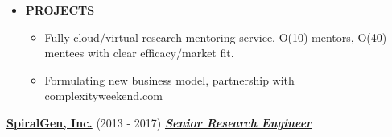 \documentclass{article}
\newcommand{\employer}[3]{{ \textbf{#1} (#2) \underline{\textbf{\emph{#3}}}\\  }}
\begin{document}
    \begin{itemize}

      \item \textbf{PROJECTS}
        \begin{itemize}
          \item Fully cloud$/$virtual research mentoring service, O(10) mentors, O(40) mentees with clear efficacy$/$market fit.  
          \item Formulating new business model, partnership with complexityweekend.com
        \end{itemize}
    \end{itemize}

\employer{\href{http://spiralgen.com/}{SpiralGen, Inc.}}{2013 - 2017}{Senior Research Engineer}


\vspace{1mm}
\end{document}

